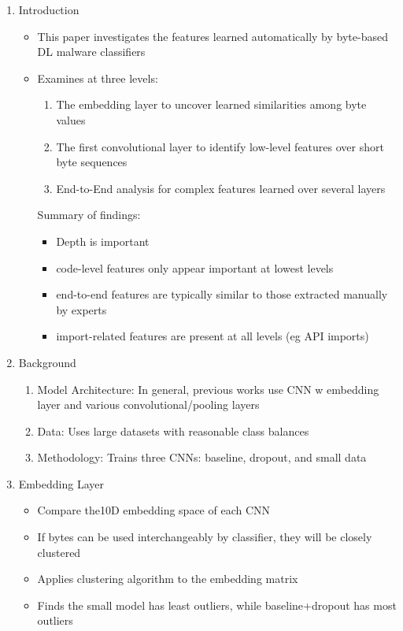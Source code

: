 \documentclass{article}
\begin{document}
\begin{enumerate}
	\item Introduction
	\begin{itemize}
		\item This paper investigates the features learned automatically by byte-based DL malware classifiers
		\item Examines at three levels:
		\begin{enumerate}
			\item The embedding layer to uncover learned similarities among byte values
			\item The first convolutional layer to identify low-level features over short byte sequences
			\item End-to-End analysis for complex features learned over several layers
		\end{enumerate}
		Summary of findings:
		\begin{itemize}
			\item Depth is important
			\item code-level features only appear important at lowest levels
			\item end-to-end features are typically similar to those extracted manually by experts
			\item import-related features are present at all levels (eg API imports)
		\end{itemize}
	\end{itemize}
	\item Background
	\begin{enumerate}
		\item Model Architecture: In general, previous works use CNN w embedding layer and various convolutional/pooling layers
		\item Data: Uses large datasets with reasonable class balances
		\item Methodology: Trains three CNNs: baseline, dropout, and small data
	\end{enumerate}
	\item Embedding Layer
	\begin{itemize}
		\item Compare the10D embedding space of each CNN
		\item If bytes can be used interchangeably by classifier, they will be closely clustered
		\item Applies clustering algorithm to the embedding matrix
		\item Finds the small model has least outliers, while baseline+dropout has most outliers

\end{itemize}
\end{enumerate}
\end{document}
